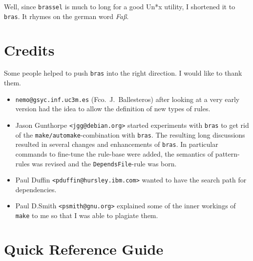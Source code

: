 \documentclass[11pt]{scrartcl}
\newcommand{\bras}{\texttt{bras}}
\newcommand{\make}{\texttt{make}}
\begin{document}
Well, since \texttt{brassel} is much to long for a good
Un*x utility, I shortened it to \bras. It rhymes on the german word
\textit{Fa\ss}.

\section{Credits}

Some people helped to push \bras{} into the right direction. I
would like to thank them. 

\begin{itemize}
\item \texttt{nemo@gsyc.inf.uc3m.es} (Fco.\ J.~Ballesteros) after
looking at a very early version had the
idea to allow the definition of new types of rules.

\item Jason Gunthorpe \texttt{<jgg@debian.org>} started experiments
  with \bras{} to get rid of the \texttt{make/automake}-combination
  with \bras{}. The resulting long discussions resulted in several
  changes and enhancements of \bras{}. In particular commands to
  fine-tune the rule-base were added, the semantics of pattern-rules
  was revised and the \texttt{DependsFile}-rule was born.
  
\item Paul Duffin \texttt{<pduffin@hursley.ibm.com>} wanted to have
  the search path for dependencies.
  
\item Paul D.Smith \texttt{<psmith@gnu.org>} explained some of the
  inner workings of \make{} to me so that I was able to plagiate them.
\end{itemize}

\clearpage
\appendix

\section{Quick Reference Guide}
\newcommand{\Tt}[1]{\texttt{#1}}
\newcommand{\It}[1]{\textit{#1}}
\newcommand{\Flash}[1]{\fbox{\bfseries #1}}
\newcommand{\Sflabel}[1]{%
  \parbox[b]{\labelwidth}{%
    \makebox[1pt][l]{\textsf{\bfseries#1:}}\\\strut}}
  
\newenvironment{Describe}
{\vskip0pt plus2cm\begin{list}{}{\renewcommand{\makelabel}{\Sflabel}}}
{\end{list}\pagebreak[2]}
\end{document}
